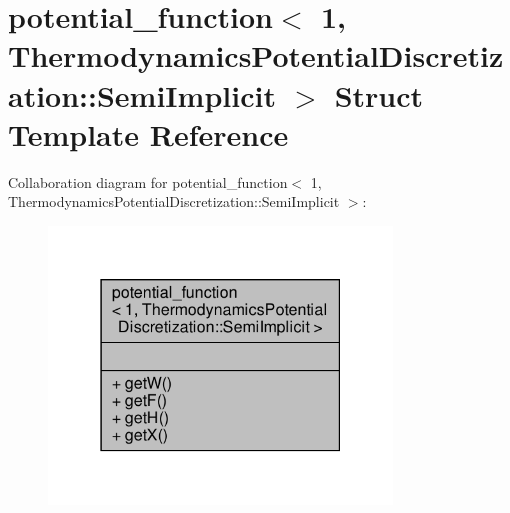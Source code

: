 \hypertarget{structpotential__function_3_011_00_01ThermodynamicsPotentialDiscretization_1_1SemiImplicit_01_4}{}\section{potential\+\_\+function$<$ 1, Thermodynamics\+Potential\+Discretization\+:\+:Semi\+Implicit $>$ Struct Template Reference}
\label{structpotential__function_3_011_00_01ThermodynamicsPotentialDiscretization_1_1SemiImplicit_01_4}


Collaboration diagram for potential\+\_\+function$<$ 1, Thermodynamics\+Potential\+Discretization\+:\+:Semi\+Implicit $>$\+:\nopagebreak
\begin{figure}[H]
\begin{center}
\leavevmode
\includegraphics[width=259pt]{structpotential__function_3_011_00_01ThermodynamicsPotentialDiscretization_1_1SemiImplicit_01_4__coll__graph}
\end{center}
\end{figure}
